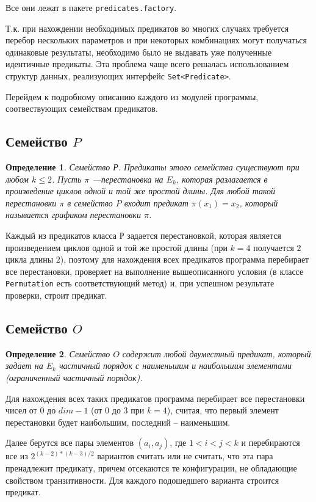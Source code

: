 \documentclass[a4paper,14pt]{extreport}
\newtheorem{opr}{Определение}
\begin{document}
Все они лежат в пакете {\tt predicates.factory}.

Т.к. при нахождении необходимых предикатов во многих случаях требуется перебор нескольких параметров и при некоторых комбинациях могут получаться  одинаковые результаты, необходимо было не выдавать уже полученные идентичные предикаты. Эта  проблема чаще всего решалась использованием структур данных, реализующих интерфейс {\tt Set<Predicate>}. 

Перейдем к подробному описанию каждого из модулей программы, соотвествующих семействам предикатов.

\subsection{Семейство $P$}
\begin{opr}
Семейство Р. Предикаты этого семейства существуют при любом $k \leqslant 2$. Пусть $\pi$ ---перестановка на $E_k$, которая разлагается в произведение циклов одной и той же простой длины. Для любой такой перестановки $\pi$ в семейство $P$ входит предикат $\pi(x_1)=x_2$, который называется графиком перестановки $\pi$. 
\end{opr}

Каждый из предикатов класса $Р$ задается перестановкой, которая является произведением циклов одной и той же простой длины (при $k=4$ получается $2$ цикла длины $2$), поэтому для нахождения всех предикатов программа перебирает все перестановки, проверяет на выполнение вышеописанного условия (в классе {\tt Permutation} есть соответствующий метод) и, при успешном результате проверки, строит предикат.

\subsection{Семейство $O$}
\begin{opr}
Семейство $O$ содержит любой двуместный предикат, который задает на $E_k$ частичный порядок с
наименьшим и наибольшим элементами (ограниченный частичный порядок). 
\end{opr}

Для нахождения всех таких предикатов программа перебирает все перестановки чисел от $0$ до $dim-1$ (от $0$ до $3$ при $k=4$), считая, что первый элемент перестановки будет наибольшим, последний – наименьшим. 

Далее берутся все пары элементов $(a_i,a_j)$, где $1<i<j<k$ и перебираются все из $2^{(k-2)*(k-3)/2}$ вариантов считать или не считать, что эта пара пренадлежит предикату, причем отсекаются те конфигурации, не обладающие свойством транзитивности. Для каждого подошедшего варианта строится предикат.
\end{document}
